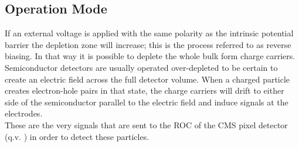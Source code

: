 \subsection{Operation Mode}
If an external voltage is applied with the same polarity as the intrinsic potential barrier the depletion zone will increase; this is the process referred to as reverse biasing. In that way it is possible to deplete the whole bulk form charge carriers. Semiconductor detectors are usually operated over-depleted to be certain to create an electric field across the full detector volume. When a charged particle creates electron-hole pairs in that state, the charge carriers will drift to either side of the semiconductor parallel to the electric field and induce signals at the electrodes.\\
These are the very signals that are sent to the \ac{ROC} of the \ac{CMS} pixel detector (q.v. ) in order to detect these particles.
